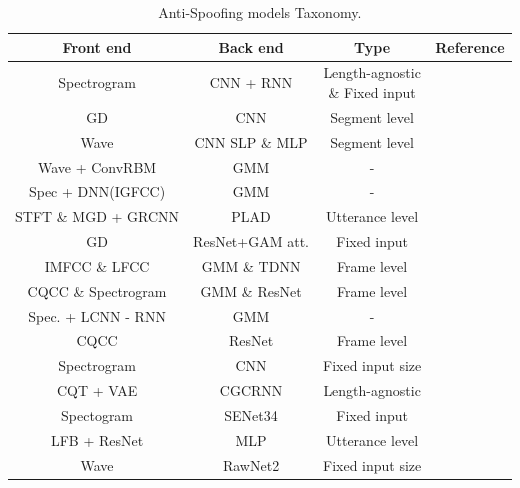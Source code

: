 \begin{center}
    \begin{table}[h]
    \centering
        \begin{tabular}{| c | c | c | c |} 
            \hline
            \textbf{Front end} & \textbf{Back end} & \textbf{Type} & \textbf{Reference} \\ [0.5ex] 
            \hline
            \hline
            Spectrogram & \acs{CNN} + \acs{RNN} & \makecell{Length-agnostic \\ \& Fixed input} & \cite{zhang2017investigation} \\ 
            \acs{GD} & \acs{CNN} & Segment level & \cite{tian2016spoofing} \\ 
            Wave & \acs{CNN} \acs{SLP} \& \acs{MLP} & Segment level & \cite{muckenhirn2017end} \\
            Wave + ConvRBM & \acs{GMM} & - & \cite{sailor2017unsupervised} \\ 
            Spec + \ac{DNN}(IGFCC) & \acs{GMM} & - & \cite{yu2017dnn} \\
            STFT \& MGD + GRCNN & PLAD & Utterance level & \cite{gomez2019gated} \\
            \hline
            \acs{GD} & ResNet+GAM att. &  Fixed input & \cite{tom2018end} \\
            IMFCC \& \acs{LFCC} & \acs{GMM} \& TDNN & Frame level & \cite{wu2014study} \\
            \acs{CQCC} \& Spectrogram & \acs{GMM} \& ResNet & Frame level & \cite{cai2017countermeasures} \\
            Spec. + \acs{LCNN} - \acs{RNN} & \acs{GMM} & - & \cite{lavrentyeva2017audio} \\
            \acs{CQCC} & ResNet & Frame level & \cite{chen2017resnet} \\
            \hline
            Spectrogram & \acs{CNN} & Fixed input size & \cite{chettri2019ensemble} \\
            \acs{CQT} + \acs{VAE} & CGCRNN & Length-agnostic & \cite{yang2019sjtu} \\
            Spectogram & SENet34 & Fixed input & \cite{lai2019assert} \\
            \acs{LFB} + ResNet & MLP & Utterance level & \cite{chen2020generalization} \\
            Wave & RawNet2 &  Fixed input size & \cite{tak2021end} \\
            \hline
        \end{tabular}
        \caption{Anti-Spoofing models Taxonomy.}
        \label{table:anti-spoofing-taxonomy}
    \end{table}
\end{center}


